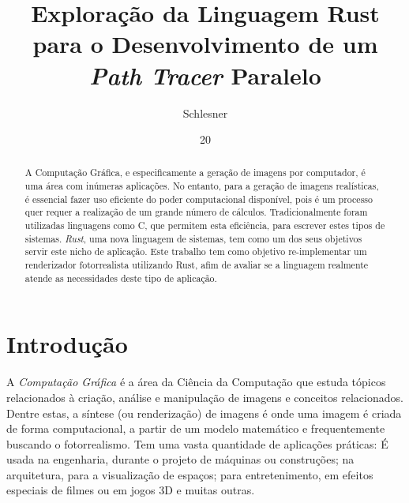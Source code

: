 \documentclass[tg]{mdtufsm}
\title{Exploração da Linguagem Rust para o Desenvolvimento de um \emph{Path Tracer} Paralelo}
\author{Schlesner}{Yuri Kunde}
\institute{Centro de Tecnologia}
\date{20}{Outubro}{2014}
\def\Cpp{{C\nolinebreak[4]\raisebox{.20ex}{\small\bf++}}}
\begin{document}
\maketitle
\makeapprove

\begin{abstract}
A Computação Gráfica, e especificamente a geração de imagens por computador, é uma área com
inúmeras aplicações. No entanto, para a geração de imagens realísticas, é essencial fazer
uso eficiente do poder computacional disponível, pois é um processo quer requer a realização
de um grande número de cálculos. Tradicionalmente foram utilizadas linguagens como \Cpp, que
permitem esta eficiência, para escrever estes tipos de sistemas. \emph{Rust}, uma nova
linguagem de sistemas, tem como um dos seus objetivos servir este nicho de aplicação. Este
trabalho tem como objetivo re-implementar um renderizador fotorrealista utilizando Rust,
afim de avaliar se a linguagem realmente atende as necessidades deste tipo de aplicação.
\end{abstract}


\setlength{\baselineskip}{1.5\baselineskip}


\chapter{Introdução}

A \emph{Computação Gráfica} é a área da Ciência da Computação que estuda tópicos relacionados à
criação, análise e manipulação de imagens e conceitos relacionados. Dentre estas, a síntese (ou
renderização) de imagens é onde uma imagem é criada de forma computacional, a partir de um modelo
matemático e frequentemente buscando o fotorrealismo. Tem uma vasta quantidade de aplicações
práticas: É usada na engenharia, durante o projeto de máquinas ou construções; na arquitetura, para
a visualização de espaços; para entretenimento, em efeitos especiais de filmes ou em jogos 3D e
muitas outras.
\end{document}
